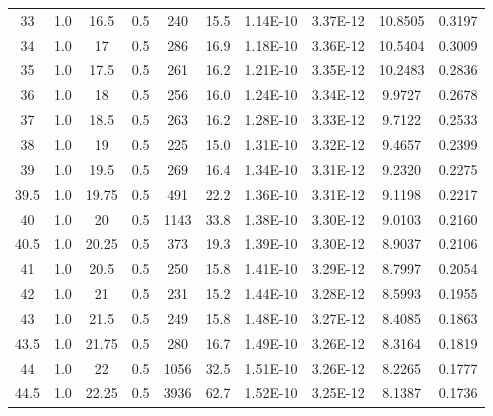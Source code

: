 \documentclass[justified]{tufte-book}
\begin{document}
\begin{table}[ht]
\begin{tabular}{cccccccccc}
33          & 1.0   & 16.5       & 0.5           & 240     & 15.5       & 1.14E-10    & 3.37E-12       & 10.8505   & 0.3197       \\
34          & 1.0   & 17         & 0.5           & 286     & 16.9       & 1.18E-10    & 3.36E-12       & 10.5404   & 0.3009       \\
35          & 1.0   & 17.5       & 0.5           & 261     & 16.2       & 1.21E-10    & 3.35E-12       & 10.2483   & 0.2836       \\
36          & 1.0   & 18         & 0.5           & 256     & 16.0       & 1.24E-10    & 3.34E-12       & 9.9727    & 0.2678       \\
37          & 1.0   & 18.5       & 0.5           & 263     & 16.2       & 1.28E-10    & 3.33E-12       & 9.7122    & 0.2533       \\
38          & 1.0   & 19         & 0.5           & 225     & 15.0       & 1.31E-10    & 3.32E-12       & 9.4657    & 0.2399       \\
39          & 1.0   & 19.5       & 0.5           & 269     & 16.4       & 1.34E-10    & 3.31E-12       & 9.2320    & 0.2275       \\
39.5        & 1.0   & 19.75      & 0.5           & 491     & 22.2       & 1.36E-10    & 3.31E-12       & 9.1198    & 0.2217       \\
40          & 1.0   & 20         & 0.5           & 1143    & 33.8       & 1.38E-10    & 3.30E-12       & 9.0103    & 0.2160       \\
40.5        & 1.0   & 20.25      & 0.5           & 373     & 19.3       & 1.39E-10    & 3.30E-12       & 8.9037    & 0.2106       \\
41          & 1.0   & 20.5       & 0.5           & 250     & 15.8       & 1.41E-10    & 3.29E-12       & 8.7997    & 0.2054       \\
42          & 1.0   & 21         & 0.5           & 231     & 15.2       & 1.44E-10    & 3.28E-12       & 8.5993    & 0.1955       \\
43          & 1.0   & 21.5       & 0.5           & 249     & 15.8       & 1.48E-10    & 3.27E-12       & 8.4085    & 0.1863       \\
43.5        & 1.0   & 21.75      & 0.5           & 280     & 16.7       & 1.49E-10    & 3.26E-12       & 8.3164    & 0.1819       \\
44          & 1.0   & 22         & 0.5           & 1056    & 32.5       & 1.51E-10    & 3.26E-12       & 8.2265    & 0.1777       \\
44.5        & 1.0   & 22.25      & 0.5           & 3936    & 62.7       & 1.52E-10    & 3.25E-12       & 8.1387    & 0.1736       \\

\end{tabular}
\end{table}
\end{document}
